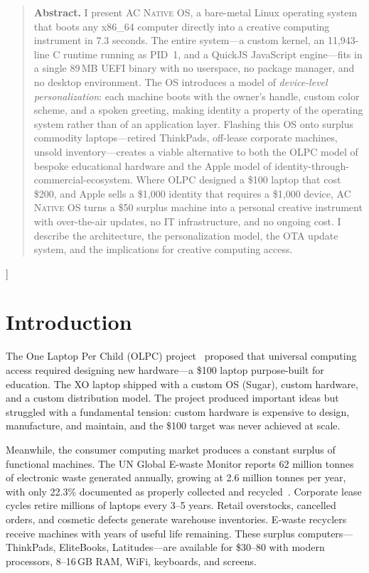 \documentclass[10pt,letterpaper,twocolumn]{article}
\newcommand{\acos}{\textsc{AC Native OS}}
\begin{document}
{\begin{quote}
\small\noindent\textbf{Abstract.}
I present \acos{}, a bare-metal Linux operating system that boots any x86\_64 computer directly into a creative computing instrument in 7.3 seconds. The entire system---a custom kernel, an 11,943-line C runtime running as PID~1, and a QuickJS JavaScript engine---fits in a single 89\,MB UEFI binary with no userspace, no package manager, and no desktop environment. The OS introduces a model of \emph{device-level personalization}: each machine boots with the owner's handle, custom color scheme, and a spoken greeting, making identity a property of the operating system rather than of an application layer. Flashing this OS onto surplus commodity laptops---retired ThinkPads, off-lease corporate machines, unsold inventory---creates a viable alternative to both the OLPC model of bespoke educational hardware and the Apple model of identity-through-commercial-ecosystem. Where OLPC designed a \$100 laptop that cost \$200, and Apple sells a \$1{,}000 identity that requires a \$1{,}000 device, \acos{} turns a \$50 surplus machine into a personal creative instrument with over-the-air updates, no IT infrastructure, and no ongoing cost. I describe the architecture, the personalization model, the OTA update system, and the implications for creative computing access.
\end{quote}
\vspace{0.5em}
}]


\section{Introduction}

The One Laptop Per Child (OLPC) project~\citep{negroponte1995being, kraemer2009olpc} proposed that universal computing access required designing new hardware---a \$100 laptop purpose-built for education. The XO laptop shipped with a custom OS (Sugar), custom hardware, and a custom distribution model. The project produced important ideas but struggled with a fundamental tension: custom hardware is expensive to design, manufacture, and maintain, and the \$100 target was never achieved at scale.

Meanwhile, the consumer computing market produces a constant surplus of functional machines. The UN Global E-waste Monitor reports 62 million tonnes of electronic waste generated annually, growing at 2.6 million tonnes per year, with only 22.3\% documented as properly collected and recycled~\citep{forti2024ewaste}. Corporate lease cycles retire millions of laptops every 3--5 years. Retail overstocks, cancelled orders, and cosmetic defects generate warehouse inventories. E-waste recyclers receive machines with years of useful life remaining. These surplus computers---ThinkPads, EliteBooks, Latitudes---are available for \$30--80 with modern processors, 8--16\,GB RAM, WiFi, keyboards, and screens.
\end{document}
